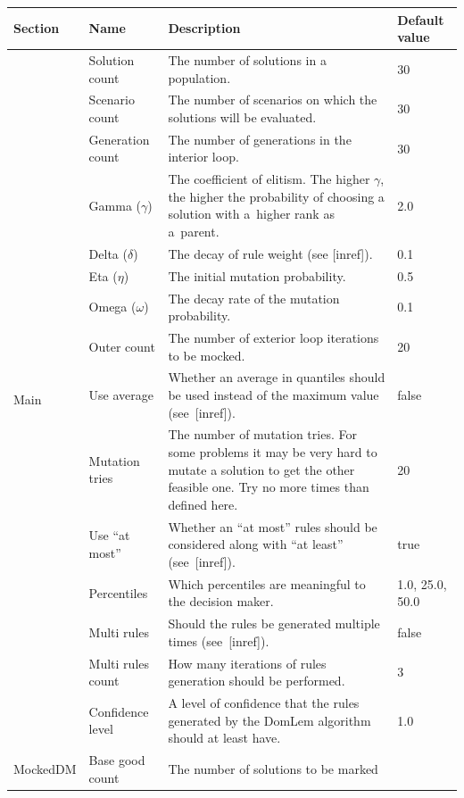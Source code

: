 \begin{table}
  \centering
  \begin{tabular}{l l p{7cm} l}
    \hline
   Section &  Name & Description & Default value \\
    \hline
    \hline
    \multirow{15}{*}{Main} & 
    Solution count & The number of solutions in a population. & 30 \\
    & Scenario count & The number of scenarios on which the solutions will be evaluated.  & 30 \\
    & Generation count & The number of generations in the interior loop. & 30 \\
    & Gamma ($\gamma$) & The coefficient of elitism. The higher $\gamma$, the
      higher the probability of choosing a solution with a~higher rank as
      a~parent. & 2.0  \\
    & Delta ($\delta$) & The decay of rule weight (see [inref]). & 0.1  \\
    & Eta ($\eta$) & The initial mutation probability.  & 0.5    \\
    & Omega ($\omega$)& The decay rate of the mutation probability. & 0.1  \\
    & Outer count & The number of exterior loop iterations to be mocked. & 20 \\
    & Use average & Whether an average in quantiles should be used instead of
      the maximum value (see~[inref]). & false  \\
    & Mutation tries & The number of mutation tries. For some problems it may be
      very hard to mutate a solution to get the other feasible one. Try no more
      times than defined here.  & 20  \\
    & Use ``at most'' & Whether an ``at most'' rules should be considered
    along with ``at least'' (see~[inref]). & true \\
    & Percentiles & Which percentiles are meaningful to the decision maker. & 1.0, 25.0, 50.0  \\
    & Multi rules & Should the rules be generated multiple times (see~[inref]). & false \\
    & Multi rules count & How many iterations of rules generation should be performed. & 3 \\
    \hline
    DomLem & Confidence level & A level of confidence that the rules generated by the
    DomLem algorithm should at least have. & 1.0 \\
    \hline
    \multirow{3}{*}{MockedDM} & Base good count & The number of solutions to be marked

\end{tabular}
\end{table}
